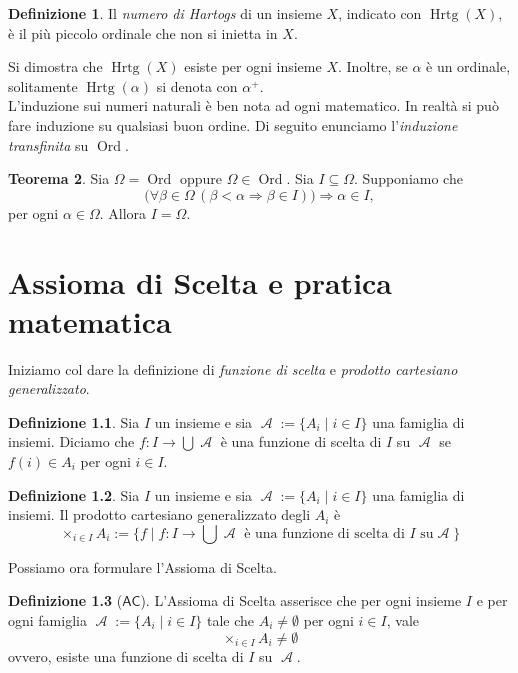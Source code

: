 \documentclass[12pt,a4paper]{report}
\theoremstyle{definition}
\newtheorem{teo}{Teorema}[section]  %
\newtheorem{defn}[teo]{Definizione}  %
\theoremstyle{num.custom-title}
\DeclareMathOperator{\A}{\mathcal{A}}
\DeclareMathOperator{\Hrtg}{\text{Hrtg}}
\DeclareMathOperator{\Ord}{\text{Ord}}
\DeclareMathOperator{\imp}{\Rightarrow}
\newcommand{\AC}{\ensuremath{\mathsf{AC}}\xspace}
\begin{document}
\begin{defn}
Il \emph{numero di Hartogs} di un insieme $X$, indicato con $\Hrtg(X)$, è il più piccolo ordinale che non si inietta in $X$. 
\end{defn}

Si dimostra che $\Hrtg(X)$ esiste per ogni insieme $X$. Inoltre, se $\alpha$ è un ordinale, solitamente $\Hrtg(\alpha)$ si denota con $\alpha^+$.\\

L'induzione sui numeri naturali è ben nota ad ogni matematico. In realtà si può fare induzione su qualsiasi buon ordine. Di seguito enunciamo l'\emph{induzione transfinita} su $\Ord$.

\begin{teo}
Sia $\Omega=\Ord$ oppure $\Omega \in \Ord$. Sia $I \subseteq \Omega$. Supponiamo che 
\[
\big(\forall \beta \in \Omega \, (\beta < \alpha \imp \beta \in I)\big) \imp \alpha \in I,
\]
per ogni $\alpha \in \Omega$. Allora $I=\Omega$.
\end{teo}




\chapter{Assioma di Scelta e pratica matematica}

Iniziamo col dare la definizione di \emph{funzione di scelta} e \emph{prodotto cartesiano generalizzato}.

\begin{defn}
Sia $I$ un insieme e sia $\A:=\{A_i \mid i \in I\}$ una famiglia di insiemi. Diciamo che $f: I \to \bigcup \A$ è una funzione di scelta di $I$ su $\A$ se $f(i) \in A_i$ per ogni $i \in I$.
\end{defn}

\begin{defn}\label{def_prod_cart_gen}
Sia $I$ un insieme e sia $\A:=\{A_i \mid i \in I\}$ una famiglia di insiemi. Il prodotto cartesiano generalizzato degli $A_i$ è 
$$\times_{i \in I} A_i := \{f \mid f : I \to \bigcup\A \text{ è una funzione di scelta di $I$ su} \A \}$$
\end{defn}

\noindent Possiamo ora formulare l'Assioma di Scelta.

\begin{defn}[\AC]\label{AC}
L'Assioma di Scelta asserisce che per ogni insieme $I$ e per ogni famiglia $\A:=\{A_i \mid i \in I\}$ tale che $A_i \neq \emptyset$ per ogni $i \in I$, vale
$$\times_{i \in I} A_i \neq \emptyset$$
ovvero, esiste una funzione di scelta di $I$ su $\A$.
\end{defn}
\end{document}
